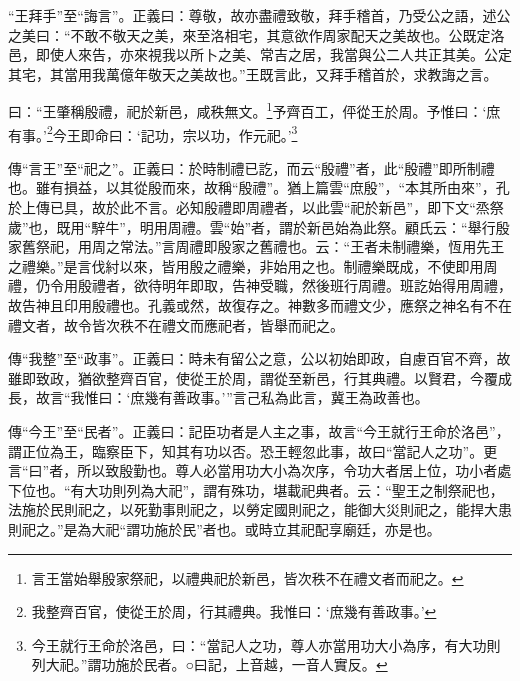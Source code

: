 {\noindent\shu{}\fzkt “王拜手”至“誨言”。正義曰：尊敬，故亦盡禮致敬，拜手稽首，乃受公之語，述公之美曰：“不敢不敬天之美，來至洛相宅，其意欲作周家配天之美故也。公既定洛邑，即使人來告，亦來視我以所卜之美、常吉之居，我當與公二人共正其美。公定其宅，其當用我萬億年敬天之美故也。”王既言此，又拜手稽首於，求教誨之言。 \par}

曰：“王肇稱殷禮，祀於新邑，咸秩無文。\footnote{言王當始舉殷家祭祀，以禮典祀於新邑，皆次秩不在禮文者而祀之。}予齊百工，伻從王於周。予惟曰：‘庶有事。’\footnote{我整齊百官，使從王於周，行其禮典。我惟曰：‘庶幾有善政事。’}今王即命曰：‘記功，宗以功，作元祀。’\footnote{今王就行王命於洛邑，曰：“當記人之功，尊人亦當用功大小為序，有大功則列大祀。”謂功施於民者。○曰記，上音越，一音人實反。}


{\noindent\zhuan{}\fzbyks 傳“言王”至“祀之”。正義曰：於時制禮已訖，而云“殷禮”者，此“殷禮”即所制禮也。雖有損益，以其從殷而來，故稱“殷禮”。猶上篇雲“庶殷”，“本其所由來”，孔於上傳已具，故於此不言。必知殷禮即周禮者，以此雲“祀於新邑”，即下文“烝祭歲”也，既用“騂牛”，明用周禮。雲“始”者，謂於新邑始為此祭。顧氏云：“舉行殷家舊祭祀，用周之常法。”言周禮即殷家之舊禮也。云：“王者未制禮樂，恆用先王之禮樂。”是言伐紂以來，皆用殷之禮樂，非始用之也。制禮樂既成，不使即用周禮，仍令用殷禮者，欲待明年即取，告神受職，然後班行周禮。班訖始得用周禮，故告神且印用殷禮也。孔義或然，故復存之。神數多而禮文少，應祭之神名有不在禮文者，故令皆次秩不在禮文而應祀者，皆舉而祀之。 \par}

{\noindent\zhuan{}\fzbyks 傳“我整”至“政事”。正義曰：時未有留公之意，公以初始即政，自慮百官不齊，故雖即致政，猶欲整齊百官，使從王於周，謂從至新邑，行其典禮。以賢君，今覆成長，故言“我惟曰：‘庶幾有善政事。’”言己私為此言，冀王為政善也。 \par}

{\noindent\zhuan{}\fzbyks 傳“今王”至“民者”。正義曰：記臣功者是人主之事，故言“今王就行王命於洛邑”，謂正位為王，臨察臣下，知其有功以否。恐王輕忽此事，故曰“當記人之功”。更言“曰”者，所以致殷勤也。尊人必當用功大小為次序，令功大者居上位，功小者處下位也。“有大功則列為大祀”，謂有殊功，堪載祀典者。云：“聖王之制祭祀也，法施於民則祀之，以死勤事則祀之，以勞定國則祀之，能御大災則祀之，能捍大患則祀之。”是為大祀“謂功施於民”者也。或時立其祀配享廟廷，亦是也。 \par}


